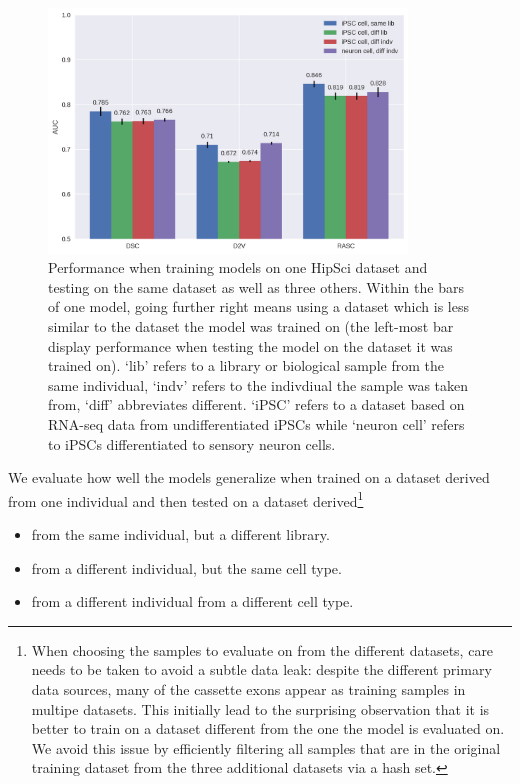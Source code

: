 \begin{figure}
	\centering\includegraphics[width=0.85\textwidth]{../visualizations/ch5-results/majiq_comparison_barcharts.png} 
	\caption{Performance when training models on one HipSci dataset and testing on the same dataset as well as three others. Within the bars of one model, going further right means using a dataset which is less similar to the dataset the model was trained on (the left-most bar display performance when testing the model on the dataset it was trained on). `lib' refers to a library or biological sample from the same individual, `indv' refers to the indivdiual the sample was taken from, `diff' abbreviates different. `iPSC' refers to a dataset based on RNA-seq data from undifferentiated iPSCs while `neuron cell' refers to iPSCs differentiated to sensory neuron cells. }
	\label{fig:majiq_comparison_barcharts}
\end{figure}


We evaluate how well the models generalize when trained on a dataset derived from one individual and then tested on a dataset derived\footnote{When choosing the samples to evaluate on from the different datasets, care needs to be taken to avoid a subtle data leak: despite the different primary data sources, many of the cassette exons appear as training samples in multipe datasets. %
	This initially lead to the surprising observation that it is better to train on a dataset different from the one the model is evaluated on. We avoid this issue by efficiently filtering all samples that are in the original training dataset from the three additional datasets via a hash set.}
\begin{itemize}
	\item from the same individual, but a different library.
	\item from a different individual, but the same cell type.
	\item from a different individual from a different cell type.
\end{itemize}


